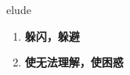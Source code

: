 
\begin{frame}
{\huge elude}
\begin{center}
\begin{enumerate}\Large
  \item \textbf{躲闪，躲避}
  \item \textbf{使无法理解，使困惑}
\end{enumerate}
\end{center}
\end{frame}
